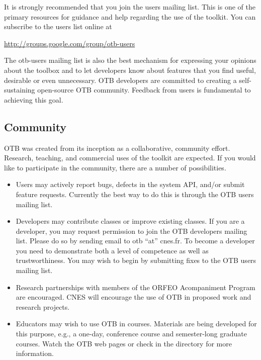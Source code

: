 
It is strongly recommended that you join the users mailing list. This is one
of the primary resources for guidance and help regarding the use of the
toolkit. You can subscribe to the users list online at

\begin{center}
\url{http://groups.google.com/group/otb-users}
\end{center}

The otb-users mailing list is also the best mechanism for expressing your
opinions about the toolbox and to let developers know about features that you
find useful, desirable or even unnecessary. OTB developers are committed to
creating a self-sustaining open-source OTB community. Feedback from users is
fundamental to achieving this goal.

\subsection{Community}
OTB was created from its inception as a collaborative, community
effort. Research, teaching, and commercial uses of the toolkit are
expected. If you would like to participate in the community, there are a
number of possibilities.

\begin{itemize}
       \item Users may actively report bugs, defects in the system API,
       and/or submit feature requests. Currently the best way to do this is
       through the OTB users mailing list.

       \item Developers may contribute classes or improve existing
       classes. If you are a developer, you may request permission to join
       the OTB developers mailing list. Please do so by sending email to
       otb ``at'' cnes.fr. To become a developer you need to
       demonstrate both a level of competence as well as
       trustworthiness. You may wish to begin by submitting fixes to the OTB
       users mailing list.

       \item Research partnerships with members of the ORFEO
       Acompaniment Program are encouraged. CNES will encourage the use of
       OTB in proposed work and research projects.


       \item Educators may wish to use OTB in courses. Materials are being
       developed for this purpose, e.g., a one-day, conference course and
       semester-long graduate courses. Watch the OTB web pages or check in
       the  directory for more information.
\end{itemize}



